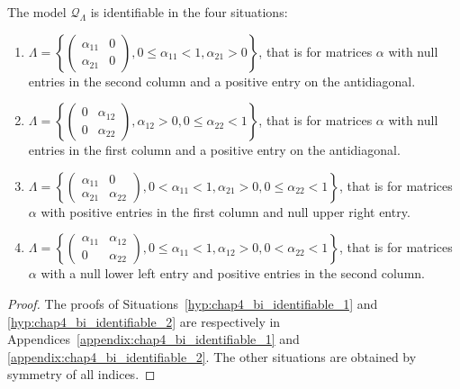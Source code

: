       \begin{proposition}\label{prop:chap4_bi_identifiable}
      	The model $\mathcal Q_\Lambda$ is identifiable in the four situations:
        \begin{enumerate}
          \item \label{hyp:chap4_bi_identifiable_1} $\Lambda = \left\{ \begin{pmatrix} \alpha_{11} & 0 \\ \alpha_{21} & 0 \end{pmatrix}, 0 \le \alpha_{11} < 1, \alpha_{21} > 0 \right\}$, that is for matrices $\alpha$ with null entries in the second column and a positive entry on the antidiagonal.
          \item \label{hyp:chap4_bi_identifiable_1_bis} $\Lambda = \left\{ \begin{pmatrix} 0 & \alpha_{12} \\ 0 & \alpha_{22} \end{pmatrix}, \alpha_{12} > 0, 0 \le \alpha_{22} < 1 \right\}$, that is for matrices $\alpha$ with null entries in the first column and a positive entry on the antidiagonal.
          \item \label{hyp:chap4_bi_identifiable_2} $\Lambda = \left\{ \begin{pmatrix} \alpha_{11} & 0 \\ \alpha_{21} & \alpha_{22} \end{pmatrix}, 0 < \alpha_{11} < 1, \alpha_{21} > 0 , 0 \le \alpha_{22} < 1 \right\}$, that is for matrices $\alpha$ with positive entries in the first column and null upper right entry.
          \item \label{hyp:chap4_bi_identifiable_2_bis} $\Lambda = \left\{ \begin{pmatrix} \alpha_{11} & \alpha_{12} \\ 0 & \alpha_{22} \end{pmatrix}, 0 \le \alpha_{11} < 1, \alpha_{12} > 0, 0 < \alpha_{22} < 1 \right\}$, that is for matrices $\alpha$ with a null lower left entry and positive entries in the second column.
        \end{enumerate}
      \end{proposition}
      \begin{proof}
        The proofs of Situations~\ref{hyp:chap4_bi_identifiable_1} and \ref{hyp:chap4_bi_identifiable_2} are respectively in Appendices~\ref{appendix:chap4_bi_identifiable_1} and \ref{appendix:chap4_bi_identifiable_2}.
        The other situations are obtained by symmetry of all indices.
      \end{proof}
      
